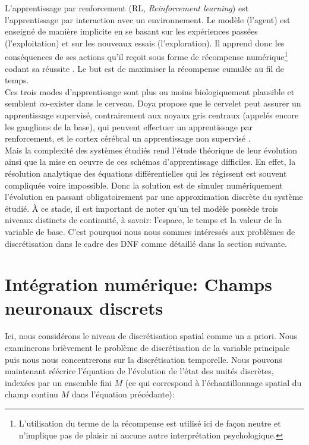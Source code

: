 L'apprentissage par renforcement (RL, \textit{Reinforcement learning}) est l'apprentissage par interaction avec un environnement. Le modèle (l'agent) est enseigné de manière implicite en se basant sur les expériences passées (l'exploitation) et sur les nouveaux essais (l'exploration). Il apprend donc les conséquences de ses actions qu'il reçoit sous forme de récompense numérique\footnote{L'utilisation du terme de la récompense est utilisé ici de façon neutre et n'implique pas de plaisir ni aucune autre interprétation psychologique.} codant sa réussite \cite{Sutton:1998, Barto:1995}. Le but est de maximiser la récompense cumulée au fil de temps. \\

Ces trois modes d'apprentissage sont plus ou moins biologiquement plausible et semblent co-exister dans le cerveau. Doya propose que le cervelet peut assurer un apprentissage supervisé, contrairement aux noyaux gris centraux (appelés encore les ganglions de la base), qui peuvent effectuer un apprentissage par renforcement, et le cortex cérébral un apprentissage non supervisé \cite{Doya:2000}. \\

Mais la complexité des systèmes étudiés rend l'étude théorique de leur évolution ainsi que la mise en oeuvre de ces schémas d'apprentissage difficiles. En effet, la résolution analytique des équations différentielles qui les régissent est souvent compliquée voire impossible. Donc la solution est de simuler numériquement l'évolution en passant obligatoirement par une approximation discrète du système étudié. À ce stade, il est important de noter qu'un tel modèle possède trois niveaux distincts de continuité, à savoir: l'espace, le temps et la valeur de la variable de base. C'est pourquoi nous nous sommes intéressés aux problèmes de discrétisation dans le cadre des DNF comme détaillé dans la section suivante.\\

\section{Intégration numérique: Champs neuronaux discrets }

Ici, nous considérons le niveau de discrétisation spatial comme un a priori. Nous examinerons brièvement le problème de discrétisation de la variable principale puis nous nous concentrerons sur la discrétisation temporelle. Nous pouvons maintenant réécrire l'équation de l'évolution de l'état des unités discrètes, indexées par un ensemble fini $M$ (ce qui correspond à l'échantillonnage spatial du champ continu $M$ dans l'équation précédante):\\

